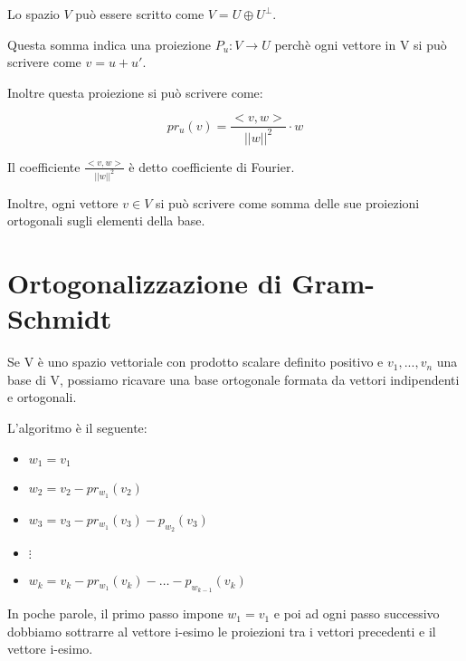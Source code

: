 \documentclass[a4paper, 10pt]{article}
\begin{document}
Lo spazio $V$ può essere scritto come $V=U \oplus U^\perp$.

Questa somma indica una proiezione $P_u: V \rightarrow U$ perchè ogni vettore in V si può scrivere come $v = u + u'$.

Inoltre questa proiezione si può scrivere come:

$$pr_u(v) = \frac{<v,w>}{||w||^2} \cdot w$$

Il coefficiente $\frac{<v,w>}{||w||^2}$ è detto coefficiente di Fourier.

Inoltre, ogni vettore $v \in V$ si può scrivere come somma delle sue proiezioni ortogonali sugli elementi della base.

\section{Ortogonalizzazione di Gram-Schmidt}

Se V è uno spazio vettoriale con prodotto scalare definito positivo e $v_1, ..., v_n$ una base di V, possiamo ricavare una base ortogonale formata da vettori indipendenti e ortogonali.

L'algoritmo è il seguente:

\begin{itemize}
	\item $w_1 = v_1$
	\item $w_2 = v_2 - pr_{w_1}(v_2)$
	\item $w_3 = v_3 - pr_{w_1}(v_3) - p_{w_2}(v_3)$
	\item $\vdots$
	\item $w_k = v_k - pr_{w_1}(v_k) - \dots - p_{w_{k-1}}(v_k)$
\end{itemize}

In poche parole, il primo passo impone $w_1 = v_1$ e poi ad ogni passo successivo dobbiamo sottrarre al vettore i-esimo le proiezioni tra i vettori precedenti e il vettore i-esimo.
\end{document}
